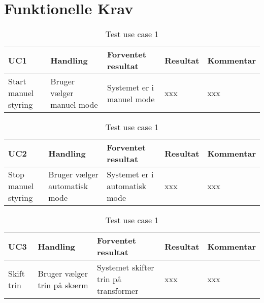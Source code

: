 
\section{Funktionelle Krav}
\begin{table}[htbp]
	\centering
	\begin{tabular}{|p{2cm}|p{3.5cm}|p{4cm}|p{2cm}|p{2.5cm}|}
		\hline
		\textbf{UC1} & \textbf{Handling} & \textbf{Forventet resultat} & \textbf{Resultat} &\textbf{Kommentar} \\\hline
		Start manuel styring & Bruger vælger manuel mode & Systemet er i manuel mode & xxx & xxx \\\hline
		
		
	\end{tabular}
	\caption{Test use case 1}
	\label{tab:TestUC1}
	
\end{table}

\begin{table}[htbp]
	\centering
	\begin{tabular}{|p{2cm}|p{3.5cm}|p{4cm}|p{2cm}|p{2.5cm}|}
		\hline
		\textbf{UC2} & \textbf{Handling} & \textbf{Forventet resultat} & \textbf{Resultat} &\textbf{Kommentar} \\\hline
		Stop manuel styring & Bruger vælger automatisk mode & Systemet er i automatisk mode & xxx & xxx \\\hline
		
		
	\end{tabular}
	\caption{Test use case 1}
	\label{tab:TestUC1}
	
\end{table}
\begin{table}[htbp]
	\centering
	\begin{tabular}{|p{2cm}|p{3.5cm}|p{4cm}|p{2cm}|p{2.5cm}|}
		\hline
		\textbf{UC3} & \textbf{Handling} & \textbf{Forventet resultat} & \textbf{Resultat} &\textbf{Kommentar} \\\hline
		Skift trin & Bruger vælger trin på skærm & Systemet skifter trin på transformer & xxx & xxx \\\hline
		
		
	\end{tabular}
	\caption{Test use case 1}
	\label{tab:TestUC1}
	
\end{table}